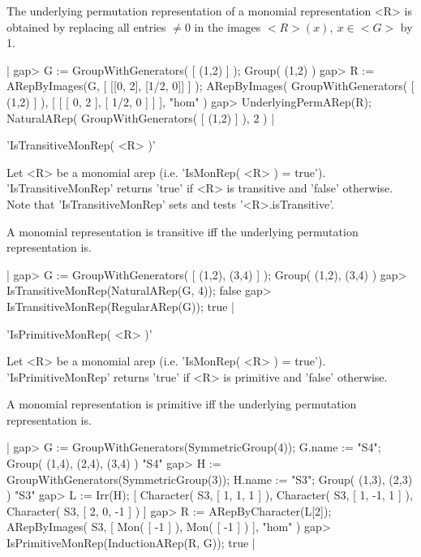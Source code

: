 The underlying permutation representation of a monomial
representation <R> is obtained by replacing all entries 
$\neq 0$ in the images $<R>(x),\ x\in <G>$ by 1.

|    gap> G := GroupWithGenerators( [ (1,2) ] );
    Group( (1,2) )
    gap> R := ARepByImages(G, [ [[0, 2], [1/2, 0]] ] );
    ARepByImages(
      GroupWithGenerators( [ (1,2) ] ),
      [ [ [ 0, 2 ], [ 1/2, 0 ] ]
      ],
      "hom"
    )
    gap> UnderlyingPermARep(R);
    NaturalARep( GroupWithGenerators( [ (1,2) ] ), 2 ) |


'IsTransitiveMonRep( <R> )'

Let <R> be a monomial arep (i.e. 'IsMonRep( <R> ) = true').
'IsTransitiveMonRep' returns 'true' if <R> is transitive 
and 'false' otherwise.
Note that 'IsTransitiveMonRep' sets and tests '<R>.isTransitive'.

A monomial representation is transitive iff the underlying 
permutation representation is.

|    gap> G := GroupWithGenerators( [ (1,2), (3,4) ] );
    Group( (1,2), (3,4) )
    gap> IsTransitiveMonRep(NaturalARep(G, 4));
    false
    gap> IsTransitiveMonRep(RegularARep(G));   
    true |


'IsPrimitiveMonRep( <R> )'

Let <R> be a monomial arep (i.e. 'IsMonRep( <R> ) = true').
'IsPrimitiveMonRep' returns 'true' if <R> is primitive 
and 'false' otherwise.

A monomial representation is primitive iff the underlying 
permutation representation is.

|    gap> G := GroupWithGenerators(SymmetricGroup(4)); G.name := "S4";
    Group( (1,4), (2,4), (3,4) )
    "S4"
    gap> H := GroupWithGenerators(SymmetricGroup(3)); H.name := "S3";
    Group( (1,3), (2,3) )
    "S3"
    gap> L := Irr(H);
    [ Character( S3, [ 1, 1, 1 ] ), Character( S3, [ 1, -1, 1 ] ), 
      Character( S3, [ 2, 0, -1 ] ) ]
    gap> R := ARepByCharacter(L[2]);
    ARepByImages(
      S3,
      [ Mon( [ -1 ] ),
        Mon( [ -1 ] )
      ],
      "hom"
    )
    gap> IsPrimitiveMonRep(InductionARep(R, G));
    true |


